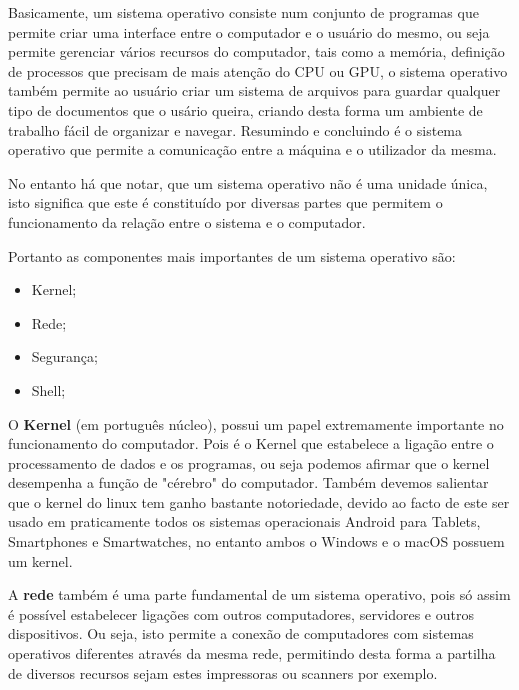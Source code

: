\documentclass{report}
\begin{document}
Basicamente, um sistema operativo consiste num conjunto de programas que permite criar uma interface entre o computador e o usuário do mesmo, ou seja permite gerenciar vários recursos do computador, tais como a memória, definição de processos que precisam de mais atenção do CPU ou GPU, o sistema operativo também permite ao usuário criar um sistema de arquivos para guardar qualquer tipo de documentos que o usário queira, criando desta forma um ambiente de trabalho fácil de organizar e navegar. Resumindo e concluindo é o sistema operativo que permite a comunicação entre a máquina e o utilizador da mesma.

\vspace{5mm} %

No entanto há que notar, que um sistema operativo não é uma unidade única, isto significa que este é constituído por diversas partes que permitem o funcionamento da relação entre o sistema e o computador.

Portanto as componentes mais importantes de um sistema operativo são:

\vspace{5mm} %

\begin{itemize}
    \item Kernel;
    \item Rede;
    \item Segurança;
    \item Shell;
\end{itemize}

\vspace{5mm} %

O \textbf{Kernel} (em português núcleo), possui um papel extremamente importante no funcionamento do computador. Pois é o Kernel que estabelece a ligação entre o processamento de dados e os programas, ou seja podemos afirmar que o kernel desempenha a função de "cérebro" do computador. Também devemos salientar que o kernel do linux tem ganho bastante notoriedade, devido ao facto de este ser usado em praticamente todos os sistemas operacionais Android para Tablets, Smartphones e Smartwatches, no entanto ambos o Windows e o macOS possuem um kernel.

\vspace{5mm} %

A \textbf{rede} também é uma parte fundamental de um sistema operativo, pois só assim é possível estabelecer ligações com outros computadores, servidores e outros dispositivos. Ou seja, isto permite a conexão de computadores com sistemas operativos diferentes através da mesma rede, permitindo desta forma a partilha de diversos recursos sejam estes impressoras ou scanners por exemplo.
\end{document}
